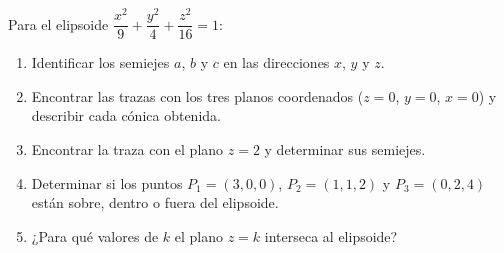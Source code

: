 Para el elipsoide $\dfrac{x^2}{9} + \dfrac{y^2}{4} + \dfrac{z^2}{16} = 1$:
\begin{enumerate}
    \item Identificar los semiejes $a$, $b$ y $c$ en las direcciones $x$, $y$ y $z$.
    \item Encontrar las trazas con los tres planos coordenados ($z=0$, $y=0$, $x=0$) y describir cada cónica obtenida.
    \item Encontrar la traza con el plano $z = 2$ y determinar sus semiejes.
    \item Determinar si los puntos $P_1 = (3, 0, 0)$, $P_2 = (1, 1, 2)$ y $P_3 = (0, 2, 4)$ están sobre, dentro o fuera del elipsoide.
    \item ¿Para qué valores de $k$ el plano $z = k$ interseca al elipsoide?
\end{enumerate}